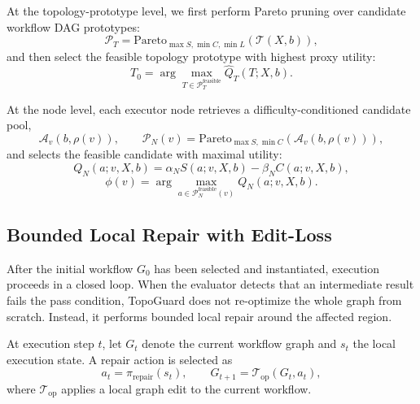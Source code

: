 \documentclass[manuscript,review,anonymous]{acmart}
\begin{document}
At the topology-prototype level, we first perform Pareto pruning over candidate workflow DAG prototypes:
\begin{equation}
\mathcal{P}_T=\text{Pareto}_{\max S,\min C,\min L}(\mathcal{T}(X,b)),
\end{equation}
and then select the feasible topology prototype with highest proxy utility:
\begin{equation}
T_0=\arg\max_{T\in\mathcal{P}_T^{\text{feasible}}}\widehat{Q}_T(T;X,b).
\end{equation}

At the node level, each executor node retrieves a difficulty-conditioned candidate pool,
\begin{equation}
\mathcal{A}_v(b,\rho(v)),
\qquad
\mathcal{P}_N(v)=\text{Pareto}_{\max S,\min C}(\mathcal{A}_v(b,\rho(v))),
\end{equation}
and selects the feasible candidate with maximal utility:
\begin{equation}
Q_N(a;v,X,b)=\alpha_N S(a;v,X,b)-\beta_N C(a;v,X,b),
\end{equation}
\begin{equation}
\phi(v)=\arg\max_{a\in\mathcal{P}_N^{\text{feasible}}(v)}Q_N(a;v,X,b).
\end{equation}

\subsection{Bounded Local Repair with Edit-Loss}
\label{sec:repair}

After the initial workflow $G_0$ has been selected and instantiated, execution proceeds in a closed loop.
When the evaluator detects that an intermediate result fails the pass condition, TopoGuard does not re-optimize the whole graph from scratch.
Instead, it performs bounded local repair around the affected region.

At execution step $t$, let $G_t$ denote the current workflow graph and $s_t$ the local execution state.
A repair action is selected as
\begin{equation}
a_t=\pi_{\mathrm{repair}}(s_t),
\qquad
G_{t+1}=\mathcal{T}_{\mathrm{op}}(G_t,a_t),
\label{eq:repair_transition}
\end{equation}
where $\mathcal{T}_{\mathrm{op}}$ applies a local graph edit to the current workflow.
\end{document}
